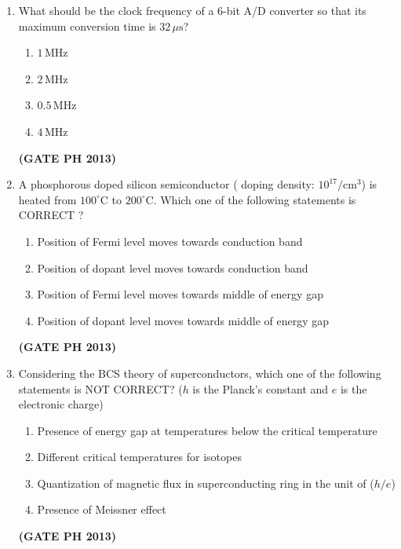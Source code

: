 \documentclass[14pt, a4paper]{extarticle}
\begin{document}
\begin{enumerate}[label=\textbf{Q. \arabic*}]
\item What should be the clock frequency of a 6-bit A/D converter so that its maximum conversion time is $32\,\mu\text{s}$?
\begin{multicols}{4}
    \begin{enumerate}
        \item $1\,\text{MHz}$
        \item $2\,\text{MHz}$
        \item $0.5\,\text{MHz}$
        \item $4\,\text{MHz}$
    \end{enumerate}
\end{multicols}
\hfill \textbf{(GATE PH 2013)}

\item A phosphorous doped silicon semiconductor ( doping density: $10^{17}/\text{cm}^3$) is heated from $100^\circ\text{C}$ to $200^\circ\text{C}$. Which one of the following statements is CORRECT ?
\begin{enumerate}
    \item Position of Fermi level moves towards conduction band
    \item Position of dopant level moves towards conduction band
    \item Position of Fermi level moves towards middle of energy gap
    \item Position of dopant level moves towards middle of energy gap
\end{enumerate}
\hfill \textbf{(GATE PH 2013)}

\item Considering the BCS theory of superconductors, which one of the following statements is NOT CORRECT? ($h$ is the Planck's constant and $e$ is the electronic charge)
\begin{enumerate}
    \item Presence of energy gap at temperatures below the critical temperature
    \item Different critical temperatures for isotopes
    \item Quantization of magnetic flux in superconducting ring in the unit of ($h/e$)
    \item Presence of Meissner effect
\end{enumerate}
\hfill \textbf{(GATE PH 2013)}


\end{enumerate}
\end{document}
